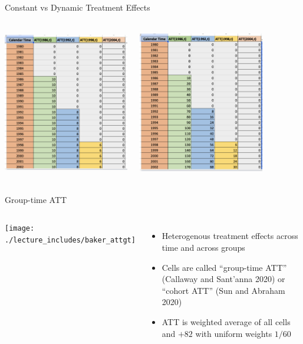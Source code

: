 \documentclass{beamer}
\begin{document}
\begin{frame}{Constant vs Dynamic Treatment Effects}
    \begin{columns}
        \centering
        \includegraphics[height=6.5cm, width=5.5cm]{./lecture_includes/constant_te}

        \centering
        \includegraphics[height=6.5cm, width=5.5cm]{./lecture_includes/dynamic_te}
    \end{columns} 
\end{frame}




\begin{frame}{Group-time ATT}
       \begin{columns}
             \centering
             \texttt{[image: ./lecture\_includes/baker\_attgt]}
		\begin{itemize}
\item Heterogenous treatment effects across time and across groups
\item Cells are called ``group-time ATT'' (Callaway and Sant'anna 2020) or ``cohort ATT'' (Sun and Abraham 2020)
\item ATT is weighted average of all cells and $+82$ with uniform weights $1/60$
		\end{itemize}
         \end{columns} 
    \end{frame}
\end{document}
